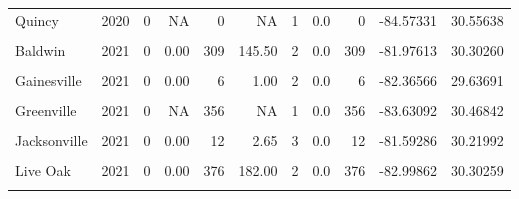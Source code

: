 \documentclass{ufdissertation}[overrideChapters] %
\begin{document}
{\begin{table}[!h]
{\begin{tabular}[t]{lrrrrrrrrrr}
Quincy & 2020 & 0 & NA & 0 & NA & 1 & 0.0 & 0 & -84.57331 & 30.55638\\
\addlinespace
\cellcolor{gray!6}{Tallahassee} & \cellcolor{gray!6}{2020} & \cellcolor{gray!6}{3364} & \cellcolor{gray!6}{4.82} & \cellcolor{gray!6}{1150} & \cellcolor{gray!6}{0.79} & \cellcolor{gray!6}{157} & \cellcolor{gray!6}{21.4} & \cellcolor{gray!6}{4514} & \cellcolor{gray!6}{-84.30878} & \cellcolor{gray!6}{30.44297}\\
Baldwin & 2021 & 0 & 0.00 & 309 & 145.50 & 2 & 0.0 & 309 & -81.97613 & 30.30260\\
\cellcolor{gray!6}{Branford} & \cellcolor{gray!6}{2021} & \cellcolor{gray!6}{0} & \cellcolor{gray!6}{NA} & \cellcolor{gray!6}{12} & \cellcolor{gray!6}{NA} & \cellcolor{gray!6}{1} & \cellcolor{gray!6}{0.0} & \cellcolor{gray!6}{12} & \cellcolor{gray!6}{-82.92316} & \cellcolor{gray!6}{29.95685}\\
Gainesville & 2021 & 0 & 0.00 & 6 & 1.00 & 2 & 0.0 & 6 & -82.36566 & 29.63691\\
\cellcolor{gray!6}{Grand Ridge} & \cellcolor{gray!6}{2021} & \cellcolor{gray!6}{0} & \cellcolor{gray!6}{0.00} & \cellcolor{gray!6}{30} & \cellcolor{gray!6}{11.00} & \cellcolor{gray!6}{2} & \cellcolor{gray!6}{0.0} & \cellcolor{gray!6}{30} & \cellcolor{gray!6}{-85.04182} & \cellcolor{gray!6}{30.71944}\\
\addlinespace
Greenville & 2021 & 0 & NA & 356 & NA & 1 & 0.0 & 356 & -83.63092 & 30.46842\\
\cellcolor{gray!6}{Greenwood} & \cellcolor{gray!6}{2021} & \cellcolor{gray!6}{0} & \cellcolor{gray!6}{NA} & \cellcolor{gray!6}{200} & \cellcolor{gray!6}{NA} & \cellcolor{gray!6}{1} & \cellcolor{gray!6}{0.0} & \cellcolor{gray!6}{200} & \cellcolor{gray!6}{-82.57149} & \cellcolor{gray!6}{28.00751}\\
Jacksonville & 2021 & 0 & 0.00 & 12 & 2.65 & 3 & 0.0 & 12 & -81.59286 & 30.21992\\
\cellcolor{gray!6}{Lake City} & \cellcolor{gray!6}{2021} & \cellcolor{gray!6}{49} & \cellcolor{gray!6}{9.80} & \cellcolor{gray!6}{472} & \cellcolor{gray!6}{77.72} & \cellcolor{gray!6}{5} & \cellcolor{gray!6}{9.8} & \cellcolor{gray!6}{521} & \cellcolor{gray!6}{-82.67590} & \cellcolor{gray!6}{30.12273}\\
Live Oak & 2021 & 0 & 0.00 & 376 & 182.00 & 2 & 0.0 & 376 & -82.99862 & 30.30259\\
\addlinespace
\cellcolor{gray!6}{Macclenny} & \cellcolor{gray!6}{2021} & \cellcolor{gray!6}{0} & \cellcolor{gray!6}{NA} & \cellcolor{gray!6}{400} & \cellcolor{gray!6}{NA} & \cellcolor{gray!6}{1} & \cellcolor{gray!6}{0.0} & \cellcolor{gray!6}{400} & \cellcolor{gray!6}{-82.11797} & \cellcolor{gray!6}{30.28349}\\

\end{tabular}}
\end{table}}
\end{document}
